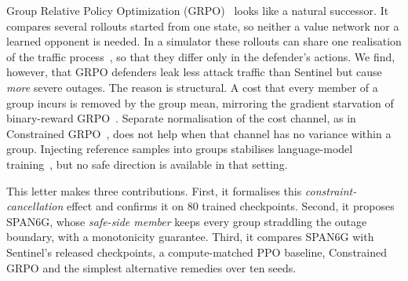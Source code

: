 \documentclass[journal]{IEEEtran}
\begin{document}
Group Relative Policy Optimization (GRPO)~\cite{shao2024deepseekmath} looks like a natural successor. It compares several rollouts started from one state, so neither a value network nor a learned opponent is needed. In a simulator these rollouts can share one realisation of the traffic process~\cite{ng2000pegasus}, so that they differ only in the defender's actions. We find, however, that GRPO defenders leak less attack traffic than Sentinel but cause \emph{more} severe outages. The reason is structural. A cost that every member of a group incurs is removed by the group mean, mirroring the gradient starvation of binary-reward GRPO~\cite{nie2026starvation,yu2025dapo}. Separate normalisation of the cost channel, as in Constrained GRPO~\cite{girgis2026cgrpo}, does not help when that channel has no variance within a group. Injecting reference samples into groups stabilises language-model training~\cite{yan2025luffy,armor2026}, but no safe direction is available in that setting.

This letter makes three contributions. First, it formalises this \emph{constraint-cancellation} effect and confirms it on 80 trained checkpoints. Second, it proposes SPAN6G, whose \emph{safe-side member} keeps every group straddling the outage boundary, with a monotonicity guarantee. Third, it compares SPAN6G with Sentinel's released checkpoints, a compute-matched PPO baseline, Constrained GRPO and the simplest alternative remedies over ten seeds.

\end{document}
